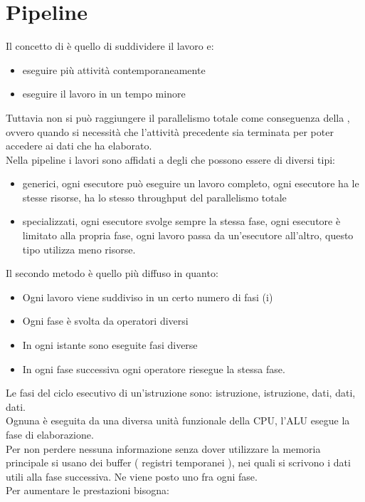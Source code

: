 \documentclass[arch.tex]{subfiles}
\begin{document}
\section{Pipeline}%
\label{sec:pipeline}
Il concetto di  è quello di suddividere il lavoro e:

\begin{itemize}
	\item eseguire più attività contemporaneamente
	\item eseguire il lavoro in un tempo minore
\end{itemize}
Tuttavia non si può raggiungere il parallelismo totale come conseguenza della , ovvero quando si necessità che l'attività precedente sia
terminata per poter accedere ai dati che ha elaborato.\\
Nella pipeline i lavori sono affidati a degli  che possono essere
di diversi tipi:

\begin{itemize}
	\item generici, ogni esecutore può eseguire un lavoro completo,
		ogni esecutore ha le stesse risorse, ha lo stesso throughput del
		parallelismo totale
	\item specializzati, ogni esecutore svolge sempre la stessa fase,
		ogni esecutore è limitato alla propria fase, ogni lavoro passa 
		da un'esecutore all'altro, questo tipo utilizza meno risorse.
\end{itemize}
Il secondo metodo è quello più diffuso in quanto:

\begin{itemize}
	\item Ogni lavoro viene suddiviso in un certo numero di fasi (i)
	\item Ogni fase è svolta da operatori diversi
	\item In ogni istante sono eseguite fasi diverse
	\item In ogni fase successiva ogni operatore riesegue la stessa fase.
\end{itemize}
Le fasi del ciclo esecutivo di un'istruzione sono:  istruzione,
 istruzione,  dati,  dati,
 dati.\\
Ognuna è eseguita da una diversa unità funzionale della CPU,
l'ALU esegue la fase di elaborazione.\\
Per non perdere nessuna informazione senza dover utilizzare la memoria 
principale si usano dei buffer ( registri temporanei ), nei quali si scrivono 
i dati utili alla fase successiva. Ne viene posto uno fra ogni fase.\\
Per aumentare le prestazioni bisogna:
\end{document}
